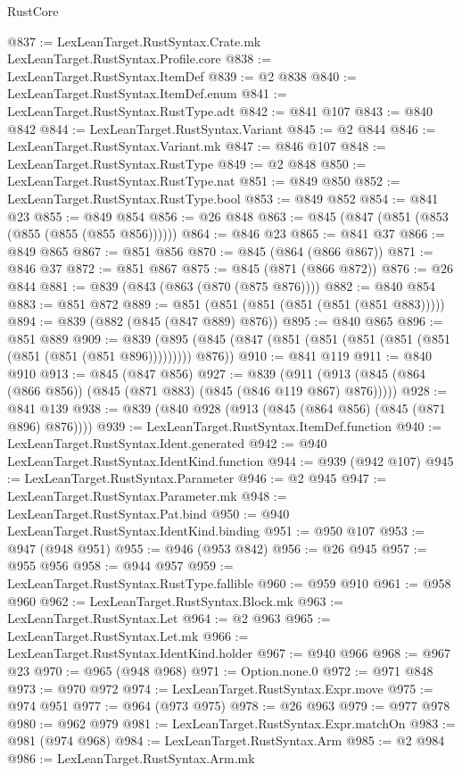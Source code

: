\begin{lexlean}{RustCore}
\begin{coremodule}
@837 := LexLeanTarget.RustSyntax.Crate.mk LexLeanTarget.RustSyntax.Profile.core
@838 := LexLeanTarget.RustSyntax.ItemDef
@839 := @2 @838
@840 := LexLeanTarget.RustSyntax.ItemDef.enum
@841 := LexLeanTarget.RustSyntax.RustType.adt
@842 := @841 @107
@843 := @840 @842
@844 := LexLeanTarget.RustSyntax.Variant
@845 := @2 @844
@846 := LexLeanTarget.RustSyntax.Variant.mk
@847 := @846 @107
@848 := LexLeanTarget.RustSyntax.RustType
@849 := @2 @848
@850 := LexLeanTarget.RustSyntax.RustType.nat
@851 := @849 @850
@852 := LexLeanTarget.RustSyntax.RustType.bool
@853 := @849 @852
@854 := @841 @23
@855 := @849 @854
@856 := @26 @848
@863 := @845 (@847 (@851 (@853 (@855 (@855 (@855 @856))))))
@864 := @846 @23
@865 := @841 @37
@866 := @849 @865
@867 := @851 @856
@870 := @845 (@864 (@866 @867))
@871 := @846 @37
@872 := @851 @867
@875 := @845 (@871 (@866 @872))
@876 := @26 @844
@881 := @839 (@843 (@863 (@870 (@875 @876))))
@882 := @840 @854
@883 := @851 @872
@889 := @851 (@851 (@851 (@851 (@851 (@851 @883)))))
@894 := @839 (@882 (@845 (@847 @889) @876))
@895 := @840 @865
@896 := @851 @889
@909 := @839 (@895 (@845 (@847 (@851 (@851 (@851 (@851 (@851 (@851 (@851 (@851 @896))))))))) @876))
@910 := @841 @119
@911 := @840 @910
@913 := @845 (@847 @856)
@927 := @839 (@911 (@913 (@845 (@864 (@866 @856)) (@845 (@871 @883) (@845 (@846 @119 @867) @876)))))
@928 := @841 @139
@938 := @839 (@840 @928 (@913 (@845 (@864 @856) (@845 (@871 @896) @876))))
@939 := LexLeanTarget.RustSyntax.ItemDef.function
@940 := LexLeanTarget.RustSyntax.Ident.generated
@942 := @940 LexLeanTarget.RustSyntax.IdentKind.function
@944 := @939 (@942 @107)
@945 := LexLeanTarget.RustSyntax.Parameter
@946 := @2 @945
@947 := LexLeanTarget.RustSyntax.Parameter.mk
@948 := LexLeanTarget.RustSyntax.Pat.bind
@950 := @940 LexLeanTarget.RustSyntax.IdentKind.binding
@951 := @950 @107
@953 := @947 (@948 @951)
@955 := @946 (@953 @842)
@956 := @26 @945
@957 := @955 @956
@958 := @944 @957
@959 := LexLeanTarget.RustSyntax.RustType.fallible
@960 := @959 @910
@961 := @958 @960
@962 := LexLeanTarget.RustSyntax.Block.mk
@963 := LexLeanTarget.RustSyntax.Let
@964 := @2 @963
@965 := LexLeanTarget.RustSyntax.Let.mk
@966 := LexLeanTarget.RustSyntax.IdentKind.holder
@967 := @940 @966
@968 := @967 @23
@970 := @965 (@948 @968)
@971 := Option.none.{0}
@972 := @971 @848
@973 := @970 @972
@974 := LexLeanTarget.RustSyntax.Expr.move
@975 := @974 @951
@977 := @964 (@973 @975)
@978 := @26 @963
@979 := @977 @978
@980 := @962 @979
@981 := LexLeanTarget.RustSyntax.Expr.matchOn
@983 := @981 (@974 @968)
@984 := LexLeanTarget.RustSyntax.Arm
@985 := @2 @984
@986 := LexLeanTarget.RustSyntax.Arm.mk

\end{coremodule}
\end{lexlean}
